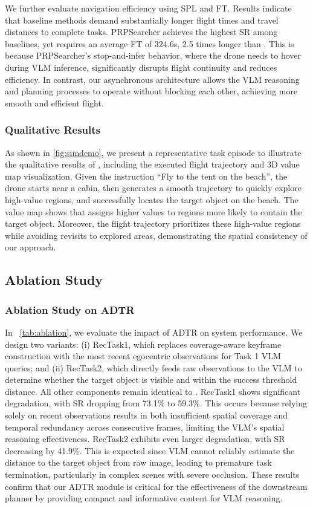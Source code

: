 We further evaluate navigation efficiency using SPL and FT.
Results indicate that baseline methods demand substantially longer flight times and travel distances to complete tasks. PRPSearcher achieves the highest SR among baselines, yet requires an average FT of 324.6s, 2.5 times longer than \sysname.
This is because PRPSearcher's stop-and-infer behavior, where the drone needs to hover during VLM inference, significantly disrupts flight continuity and reduces efficiency.
In contrast, our asynchronous architecture allows the VLM reasoning and planning processes to operate without blocking each other, achieving more smooth and efficient flight.
 

\subsubsection{Qualitative Results}
As shown in \fig\ref{fig:simdemo}, we present a representative task episode to illustrate the qualitative results of \sysname, including the executed flight trajectory and 3D value map visualization. Given the instruction ``Fly to the tent on the beach'', the drone starts near a cabin, then generates a smooth trajectory to quickly explore high-value regions, and successfully locates the target object on the beach. The value map shows that \sysname assigns higher values to regions more likely to contain the target object. Moreover, the flight trajectory prioritizes these high-value regions while avoiding revisits to explored areas, demonstrating the spatial consistency of our approach.


\subsection{Ablation Study}
\subsubsection{Ablation Study on ADTR}
In \tab~\ref{tab:ablation}, we evaluate the impact of ADTR on system performance. We design two variants: (i) RecTask1, which replaces coverage-aware keyframe construction with the most recent egocentric observations for Task 1 VLM queries; and (ii) RecTask2, which directly feeds raw observations to the VLM to determine whether the target object is visible and within the success threshold distance. All other components remain identical to \sysname. 
RecTask1 shows significant degradation, with SR dropping from 73.1\% to 59.3\%. This occurs because relying solely on recent observations results in both insufficient spatial coverage and temporal redundancy across consecutive frames, limiting the VLM's spatial reasoning effectiveness.
RecTask2 exhibits even larger degradation, with SR decreasing by 41.9\%. This is expected since VLM cannot reliably estimate the distance to the target object from raw image, leading to premature task termination, particularly in complex scenes with severe occlusion.
These results confirm that our ADTR module is critical for the effectiveness of the downstream planner by providing compact and informative content for VLM reasoning.


